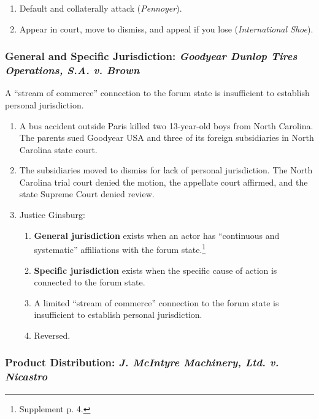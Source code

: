 \begin{enumerate}
    \item Default and collaterally attack (\emph{Pennoyer}).
    \item Appear in court, move to dismiss, and appeal if you lose 
    (\emph{International Shoe}).
\end{enumerate}

\subsubsection{General and Specific Jurisdiction: \emph{Goodyear Dunlop Tires 
Operations, S.A. v. Brown}} %
 
A ``stream of commerce'' connection to the forum state is insufficient to 
establish personal jurisdiction.

\begin{enumerate}
    \item A bus accident outside Paris killed two 13-year-old boys from North 
    Carolina. The parents sued Goodyear USA and three of its foreign 
    subsidiaries in North Carolina state court.
    \item The subsidiaries moved to dismiss for lack of personal jurisdiction. 
    The North Carolina trial court denied the motion, the appellate court 
    affirmed, and the state Supreme Court denied review.
    \item Justice Ginsburg:
    \begin{enumerate}
        \item \textbf{General jurisdiction} exists when an actor has 
        ``continuous and systematic'' affiliations with the forum 
        state.\footnote{Supplement p. 4.}
        \item \textbf{Specific jurisdiction} exists when the specific cause of 
        action is connected to the forum state.
        \item A limited ``stream of commerce'' connection to the forum state 
        is insufficient to establish personal jurisdiction.
        \item Reversed.
    \end{enumerate}
\end{enumerate}

\subsubsection{Product Distribution: \emph{J. McIntyre Machinery, Ltd. v. 
Nicastro}}

